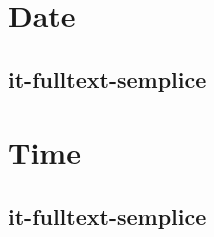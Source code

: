 \documentclass[italian]{article}
\begin{document}
	\section{Date}
	\subsection{it-fulltext-semplice}
	
	\section{Time}
	\subsection{it-fulltext-semplice}
	
\end{document}
